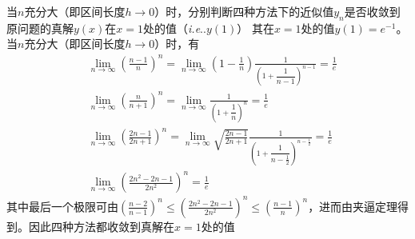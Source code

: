 \documentclass[11pt]{article}
\makeatletter
\DeclareRobustCommand\onedot{\futurelet\@let@token\@onedot}
\def\@onedot{\ifx\@let@token.\else.\null\fi\xspace}
\def\ie{\emph{i.e}\onedot}
\makeatother
\begin{document}
\begin{question}
\begin{subquestion}{当$n$充分大（即区间长度$h \rightarrow 0$）时，分别判断四种方法下的近似值$y_n$是否收敛到原问题的真解$y(x)$在$x = 1$处的值（\ie $y(1)$）}
{            其在$x = 1$处的值$y(1) = e^{-1}$。当$n$充分大（即区间长度$h \rightarrow 0$）时，有
            \begin{align*}
                 & \lim_{n \rightarrow \infty}\left(\frac{n - 1}{n}\right)^{n} = \lim_{n \rightarrow \infty}\left(1 - \frac{1}{n}\right)\frac{1}{\left(1 + \dfrac{1}{n - 1}\right)^{n - 1}} = \frac{1}{e}                            \\
                 & \lim_{n \rightarrow \infty}\left(\frac{n}{n + 1}\right)^{n} = \lim_{n \rightarrow \infty}\frac{1}{\left(1 + \dfrac{1}{n}\right)^{n}} = \frac{1}{e}                                                                \\
                 & \lim_{n \rightarrow \infty}\left(\frac{2n - 1}{2n + 1}\right)^{n} = \lim_{n \rightarrow \infty}\sqrt{\frac{2n - 1}{2n + 1}}\frac{1}{\left(1 + \dfrac{1}{n - \frac{1}{2}}\right)^{n - \frac{1}{2}}} =  \frac{1}{e} \\
                 & \lim_{n \rightarrow \infty}\left(\frac{2n^2 - 2n - 1}{2n^2}\right)^{n} = \frac{1}{e}
            \end{align*}
            其中最后一个极限可由$\left(\displaystyle \frac{n - 2}{n - 1}\right)^{n} \leqslant \left(\displaystyle \frac{2n^2 - 2n - 1}{2n^2}\right)^{n} \leqslant \left(\displaystyle \frac{n - 1}{n}\right)^{n}$，进而由夹逼定理得到。因此四种方法都收敛到真解在$x = 1$处的值
        }
    \end{subquestion}
\end{question}
\end{document}
